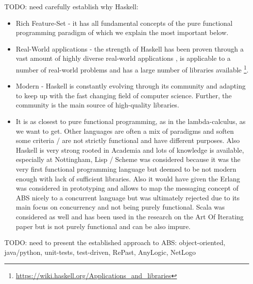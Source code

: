 TODO: need carefully establish why Haskell:
\begin{itemize}
	\item Rich Feature-Set - it has all fundamental concepts of the pure functional programming paradigm of which we explain the most important below.
	\item Real-World applications - the strength of Haskell has been proven through a vast amount of highly diverse real-world applications \cite{hudak_history_2007}, is applicable to a number of real-world problems \cite{osullivan_real_2008} and has a large number of libraries available \footnote{\url{https://wiki.haskell.org/Applications_and_libraries}}.
	\item Modern - Haskell is constantly evolving through its community and adapting to keep up with the fast changing field of computer science. Further, the community is the main source of high-quality libraries.
	\item It is as closest to pure functional programming, as in the lambda-calculus, as we want to get. Other languages are often a mix of paradigms and soften some criteria / are not strictly functional and have different purposes. Also Haskell is very strong rooted in Academia and lots of knowledge is available, especially at Nottingham, 
		Lisp / Scheme was considered because it was the very first functional programming language but deemed to be not modern enough with lack of sufficient libraries. Also it would have given the 
		Erlang was considered in prototyping and allows to map the messaging concept of ABS nicely to a concurrent language but was ultimately rejected due to its main focus on concurrency and not being purely functional.
		Scala was considered as well and has been used in the research on the Art Of Iterating paper but is not purely functional and can be also impure.
\end{itemize}

TODO: need to present the established approach to ABS: object-oriented, java/python, unit-tests, test-driven, RePast, AnyLogic, NetLogo
